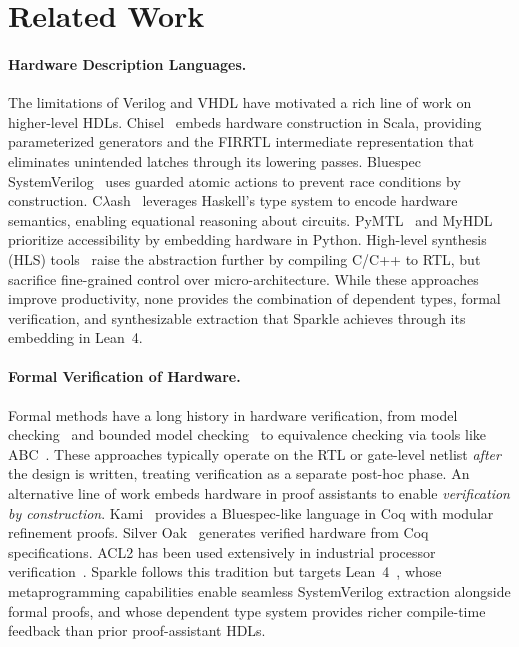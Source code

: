 \section{Related Work}
\label{sec:related}

\paragraph{Hardware Description Languages.}
The limitations of Verilog and VHDL have motivated a rich line of work on higher-level HDLs. Chisel~\citep{bachrach2012chisel} embeds hardware construction in Scala, providing parameterized generators and the FIRRTL intermediate representation that eliminates unintended latches through its lowering passes. Bluespec SystemVerilog~\citep{nikhil2004bluespec} uses guarded atomic actions to prevent race conditions by construction. C$\lambda$ash~\citep{baaij2010clash} leverages Haskell's type system to encode hardware semantics, enabling equational reasoning about circuits. PyMTL~\citep{lockhart2014pymtl} and MyHDL~\citep{decaluwe2004myhdl} prioritize accessibility by embedding hardware in Python. High-level synthesis (HLS) tools~\citep{cong2011hls,canis2011legup} raise the abstraction further by compiling C/C++ to RTL, but sacrifice fine-grained control over micro-architecture. While these approaches improve productivity, none provides the combination of dependent types, formal verification, and synthesizable extraction that Sparkle achieves through its embedding in Lean~4.

\paragraph{Formal Verification of Hardware.}
Formal methods have a long history in hardware verification, from model checking~\citep{clarke2018model} and bounded model checking~\citep{biere2009bounded} to equivalence checking via tools like ABC~\citep{brayton2010abc}. These approaches typically operate on the RTL or gate-level netlist \emph{after} the design is written, treating verification as a separate post-hoc phase. An alternative line of work embeds hardware in proof assistants to enable \emph{verification by construction}. Kami~\citep{choi2017kami} provides a Bluespec-like language in Coq with modular refinement proofs. Silver Oak~\citep{silveroak2021} generates verified hardware from Coq specifications. ACL2 has been used extensively in industrial processor verification~\citep{hunt2017industrial}. Sparkle follows this tradition but targets Lean~4~\citep{moura2021lean4}, whose metaprogramming capabilities enable seamless SystemVerilog extraction alongside formal proofs, and whose dependent type system provides richer compile-time feedback than prior proof-assistant HDLs.

